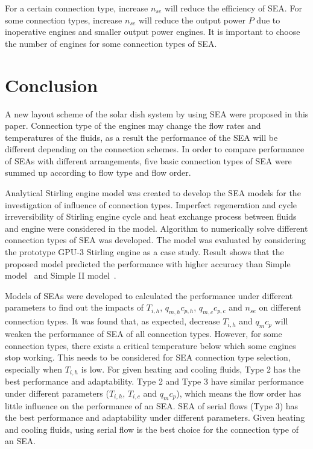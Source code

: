 \documentclass[review,3p,10t]{elsarticle}
\begin{document}
For a certain connection type, increase $n_{se}$ will reduce the efficiency of SEA. For some connection types, increase $n_{se}$ will reduce the output power $P$ due to inoperative engines and smaller output power engines. It is important to choose the number of engines for some connection types of SEA. 

\section{Conclusion}

A new layout scheme of the solar dish system by using SEA were proposed in this paper. Connection type of the engines may change the flow rates and temperatures of the fluids, as a result the performance of the SEA will be different depending on the connection schemes. In order to compare performance of SEAs with different arrangements, five basic connection types of SEA were summed up according to flow type and flow order. 

Analytical Stirling engine model was created to develop the SEA models for the investigation of influence of connection types. Imperfect regeneration and cycle irreversibility of Stirling engine cycle and heat exchange process between fluids and engine were considered in the model. Algorithm to numerically solve different connection types of SEA was developed. The model was evaluated by considering the prototype GPU-3 Stirling engine as a case study. Result shows that the proposed model predicted the performance with higher accuracy than Simple model~\cite{Urieli1984} and Simple II model~\cite{Strauss2010}. 

Models of SEAs were developed to calculated the performance under different parameters to find out the impacts of $T_{i,h}$, $q_{m,h}c_{p,h}$, $q_{m,c}c_{p,c}$ and $n_{se}$ on different connection types. It was found that, as expected, decrease $T_{i,h}$ and $q_{m}c_{p}$ will weaken the performance of SEA of all connection types. However, for some connection types, there exists a critical temperature below which some engines stop working. This needs to be considered for SEA connection type selection, especially when $T_{i,h}$ is low. For given heating and cooling fluids, Type 2 has the best performance and adaptability. Type 2 and Type 3 have similar performance under different parameters ($T_{i,h}$, $T_{i,c}$ and $q_mc_p$), which means the flow order has little influence on the performance of an SEA. SEA of serial flows (Type 3) has the best performance and adaptability under different parameters. Given heating and cooling fluids, using serial flow is the best choice for the connection type of an SEA. %
\end{document}
